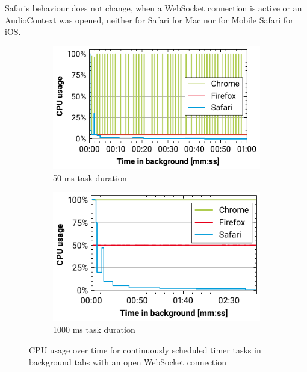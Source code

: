 \documentclass[
	ruledheaders=section,%
	class=report,%
	thesis={type=bachelor},%
	accentcolor=9c,%
	custommargins=true,%
	marginpar=false,%
	parskip=half-,%
	fontsize=11pt,%
]{tudapub}
\begin{document}
  Safaris behaviour does not change, when a WebSocket connection is active or an AudioContext was opened, neither for Safari for Mac nor for Mobile Safari for iOS.

  \begin{figure}
    \begin{subfigure}[t]{0.5\textwidth}
      \includegraphics[width=\textwidth]{images/websocket-50.pdf}
      \caption{50 ms task duration}
    \end{subfigure}
    \hfill
    \begin{subfigure}[t]{0.5\textwidth}
      \includegraphics[width=\textwidth]{images/websocket-1000.pdf}
      \caption{1000 ms task duration}
    \end{subfigure}

    \caption{CPU usage over time for continuously scheduled timer tasks in background tabs with an open WebSocket connection}
    \label{fig:websocket}
  \end{figure}
\end{document}
